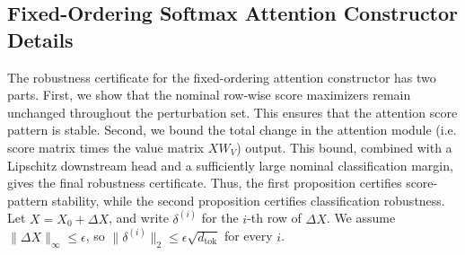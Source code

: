 \documentclass{article}
\theoremstyle{definition}
\begin{document}
\subsection{Fixed-Ordering Softmax Attention Constructor Details}
\label{app:fixed_attention}

The robustness certificate for the fixed-ordering attention constructor has two parts. First, we show that the nominal row-wise score maximizers remain unchanged throughout the perturbation set. This ensures that the attention score pattern is stable. Second, we bound the total change in the attention module (i.e. score matrix times the value matrix $XW_V$) output. This bound, combined with a Lipschitz downstream head and a sufficiently large nominal classification margin, gives the final robustness certificate. Thus, the first proposition certifies score-pattern stability, while the second proposition certifies classification robustness. Let $X=X_0+\Delta X$, and write $\delta^{(i)}$ for the $i$-th row of $\Delta X$. We assume $\|\Delta X\|_\infty\leq \epsilon$, so $\|\delta^{(i)}\|_2\leq \epsilon\sqrt{d_{\mathrm{tok}}}$ for every $i$.
\end{document}
